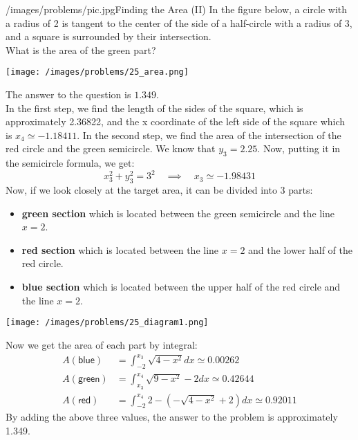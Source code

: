 \begin{problem}{/images/problems/pic.jpg}{Finding the Area (II)}
In the figure below, a circle with a radius of 2 is tangent to the center of the side of a half-circle with a radius of 3, and a square is surrounded by their intersection.\\[0.2cm]

What is the area of the green part?

\begin{center}
	\texttt{[image: /images/problems/25\_area.png]}
\end{center}


\end{problem}
\begin{solution}
The answer to the question is $1.349$.\\[0.2cm]
 \noindent In the first step, we find the length of the sides of the square, which is approximately 2.36822, and the x coordinate of the left side of the square which is $x_4 \simeq -1.18411$. In the second step, we find the area of the intersection of the red circle and the green semicircle. We know that $y_3 = 2.25$. Now, putting it in the semicircle formula, we get: $$ x_3^2+y_3^2 = 3^2 \quad \implies \quad x_3 \simeq -1.98431 $$ Now, if we look closely at the target area, it can be divided into 3 parts: 
 \begin{itemize}
 \item \textbf{green section} which is located between the green semicircle and the line $x=2$. 
 \item \textbf{red section} which is located between the line $x=2$ and the lower half of the red circle. 
 \item \textbf{blue section} which is located between the upper half of the red circle and the line $x=2$. 
 \end{itemize}
\begin{center}
	\texttt{[image: /images/problems/25\_diagram1.png]}
\end{center}
 
 Now we get the area of each part by integral: $$ \begin{aligned} A(\textsf{blue}) &= \int_{-2}^{x_3}\sqrt{4-x^2}dx \simeq 0.00262 \\ A(\textsf{green}) &= \int_{x_3}^{x_4}\sqrt{9-x^2}-2 dx \simeq 0.42644 \\ A(\textsf{red}) &= \int_{-2}^{x_4}2 - (-\sqrt{4-x^2} + 2) dx \simeq 0.92011 \end{aligned} $$ By adding the above three values, the answer to the problem is approximately 1.349.
\end{solution}